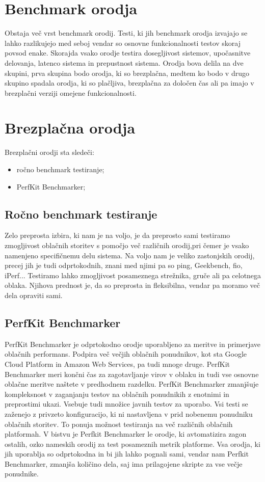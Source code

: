 \section{Benchmark orodja}
Obstaja več vrst benchmark orodij. Testi, ki jih benchmark orodja izvajajo se lahko razlikujejo med seboj vendar so osnovne funkcionalnosti testov skoraj povsod enake. Skorajda vsako orodje testira dosegljivost sistemov, upočasnitve delovanja, latenco sistema in prepustnost sistema. Orodja bova delila na dve skupini, prva skupina bodo orodja, ki so brezplačna, medtem ko bodo v drugo skupino spadala orodja, ki so plačljiva, brezplačna za določen čas ali pa imajo v brezplačni verziji omejene funkcionalnosti.

\section{Brezplačna orodja}
Brezplačni orodji sta sledeči:
\begin{itemize}
\item ročno benchmark testiranje;
\item PerfKit Benchmarker;
\end{itemize}

\subsection{Ročno benchmark testiranje}
Zelo preprosta izbira, ki nam je na voljo, je da preprosto sami testiramo zmogljivost oblačnih storitev s pomočjo več različnih orodij,pri čemer je vsako namenjeno specifičnemu delu sistema. Na voljo nam je veliko zastonjskih orodij, precej jih je tudi odprtokodnih, znani med njimi pa so ping, Geekbench, fio, iPerf... Testiramo lahko zmogljivost posameznega strežnika, gruče ali pa celotnega oblaka. Njihova prednost je, da so preprosta in fleksibilna, vendar pa moramo več dela opraviti sami.

\subsection{PerfKit Benchmarker}
PerfKit Benchmarker je odprtokodno orodje uporabljeno za meritve in primerjave oblačnih performans.
Podpira več večjih oblačnih ponudnikov, kot sta Google Cloud Platform in Amazon Web Services, pa tudi mnoge druge.
PerfKit Benchmarker meri končni čas za zagotavljanje virov v oblaku in tudi vse osnovne oblačne meritve naštete v predhodnem razdelku. PerfKit Benchmarker zmanjšuje kompleksnost v zaganjanju testov na oblačnih ponudnikih z enotnimi in preprostimi ukazi.
Vsebuje tudi množice javnih testov za uporabo. Vsi testi se zaženejo z privzeto konfiguracijo, ki ni nastavljena v prid nobenemu ponudniku oblačnih storitev. To ponuja možnost testiranja na več različnih oblačnih platformah.
V bistvu je Perfkit Benchmarker le orodje, ki avtomatizira zagon ostalih, ozko nameskih orodij za test posameznih metrik platforme. Vsa orodja, ki jih uporablja so odprtokodna in bi jih lahko pognali sami, vendar nam Perfkit Benchmarker, zmanjša količino dela, saj ima prilagojene skripte za vse večje ponudnike.

